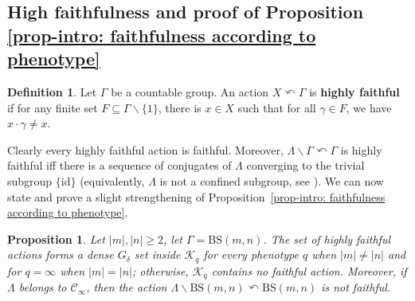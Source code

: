 \documentclass[12pt]{article}
\numberwithin{equation}{section}
\newtheorem{proposition}[equation]{Proposition}
\theoremstyle{definition}
\newtheorem{definition}[equation]{Definition}
\newcommand{\abs}[1]{\left\lvert #1\right\rvert}
\newcommand{\PK}{\mathcal{K}}
\def\id{\mathrm{id}}
\newcommand\BSo{\mathrm{BS}}
\newcommand{\bs}{\backslash}
\begin{document}
\subsection{High faithfulness and proof of Proposition 
\ref{prop-intro: faithfulness according to phenotype}}

\begin{definition}
	Let \(\Gamma\) be a countable group.
    An action $X\curvearrowleft \Gamma$ is \textbf{highly faithful} if for any 
    finite set $F\subseteq\Gamma\smallsetminus\{1\}$, there
    is \(x\in X\) such that 
    for all \(\gamma\in F\), we have \(x\cdot \gamma\neq x\).
\end{definition}

Clearly every highly faithful action is faithful. 
Moreover, \(\Lambda\bs\Gamma\curvearrowleft\Gamma\) is highly faithful
iff there is a sequence of conjugates of \(\Lambda\) converging to 
the trivial subgroup \(\{\id\}\) (equivalently, \(\Lambda\) is 
not a confined subgroup, see \cite{leboudecConfinedSubgroupsHigh2022}).
We can now state and prove a slight strengthening 
of Proposition~\ref{prop-intro: faithfulness according to phenotype}.


\begin{proposition}\label{prop: faithfulness according to phenotype}
Let $\abs{m},\abs{n}\geq 2$, let \(\Gamma=\BSo(m,n)\).
The set of highly faithful actions forms a dense \( G_\delta \) set inside $\PK_q$ 
for every phenotype $q$ when $\abs{m} \neq \abs{n}$ 
and for $q=\infty$ when $\abs{m} = \abs{n}$; otherwise, $\PK_q$ contains no faithful action. 
Moreover, if $\Lambda$ belongs to $\mathcal{C}_\infty$, 
then the action $\Lambda\bs \BSo(m,n)\curvearrowleft \BSo(m,n)$ is not faithful.
\end{proposition}
\end{document}
